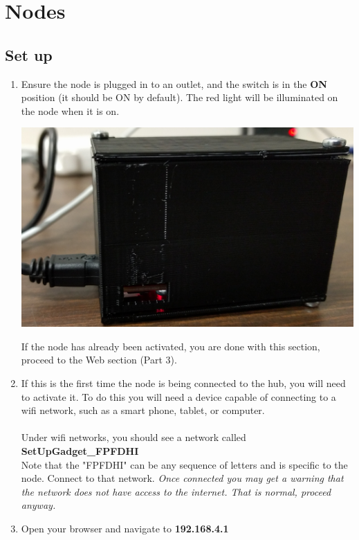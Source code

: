   \section{Nodes}
  \subsection{Set up}
    \begin{enumerate}
      \item Ensure the node is plugged in to an outlet, and the switch is in the \textbf{ON} position 
      (it should be ON by default).
      The red light will be illuminated on the node when it is on.
      \begin{center}
      \includegraphics[scale=.1]{images/nodes.png}
    \end{center}

      If the node has already been activated, you are done with this section, proceed to the Web section (Part 3).

      \item If this is the first time the node is being connected to the hub,
      you will need to activate it. To do this you will need a device
      capable of connecting to a wifi network, such as a smart phone, tablet, or computer.\\
      \\ 
      Under wifi networks, you should see a network called \textbf{SetUpGadget\_FPFDHI}\\
      Note that the "FPFDHI" can be any sequence of letters and is specific to the node. Connect to that network. 
      \emph{Once connected you may get a warning that the network does not have access
      to the internet. That is normal, proceed anyway.}

      \item Open your browser and navigate to \textbf{192.168.4.1}


\end{enumerate}

